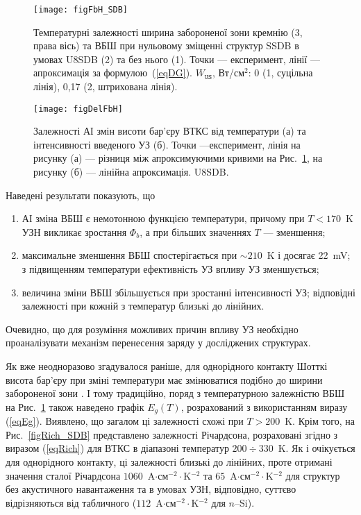 \begin{figure}
\center
\texttt{[image: figFbH\_SDB]}
\caption{\label{figFbH_SDB}
Температурні залежності ширина забороненої зони кремнію (3, права вісь)
та ВБШ при нульовому зміщенні структур SSDB в умовах U8SDB (2) та без нього (1).
Точки --- експеримент,
лінії --- апроксимація за формулою~(\ref{eqDG}).
$W_\mathtt{US}$,  Вт/см$^2$: 0 (1, суцільна лінія), 0,17 (2, штрихована лінія).
}%
\end{figure}


\begin{figure}
\center
\texttt{[image: figDelFbH]}
\caption{\label{figDelFbH}
Залежності АІ змін висоти бар'єру ВТКС від температури (а) та інтенсивності введеного УЗ (б).
Точки ---експеримент,
лінія на рисунку (а) --- різниця між апроксимуючими кривими на Рис.~\ref{figFbH_SDB},
на рисунку (б) --- лінійна апроксимація.
U8SDB.
}%
\end{figure}

Наведені результати показують, що
\begin{enumerate}[label=\asbuk*),leftmargin=0em,itemindent=1.5em]
\item АІ зміна ВБШ є немотонною функцією температури, причому при $T<170$~K УЗН викликає зростання $\Phi_b$,
а при більших значеннях $T$ --- зменшення;
\item максимальне зменшення ВБШ спостерігається при $\sim210$~K і досягає 22~mV;
з підвищенням температури ефективність УЗ впливу УЗ зменшується;
\item величина зміни ВБШ збільшується при зростанні інтенсивності УЗ; відповідні залежності при кожній з температур
близькі до лінійних.
\end{enumerate}
Очевидно, що для розуміння можливих причин впливу УЗ необхідно проаналізувати механізм перенесення заряду
у досліджених структурах.

Як вже неодноразово згадувалося раніше, для однорідного контакту Шотткі висота бар'єру при зміні температури має змінюватися подібно
до ширини забороненої зони \cite{Rhoderick1988,Aboelfotoh,Zhua}.
І тому традиційно, поряд з температурною залежністю ВБШ на Рис.~\ref{figFbH_SDB} також наведено графік $E_g(T)$,
розрахований з використанням виразу (\ref{eqEg}).
Виявлено, що загалом ці залежності схожі при $T>200$~K.
Крім того, на Рис.~\ref{figRich_SDB} представлено залежності Річардсона, розраховані згідно з
виразом (\ref{eqRich}) для ВТКС в діапазоні температур $200\div330$~K.
Як і очікується для однорідного контакту, ці залежності близькі до лінійних,
проте отримані значення сталої Річардсона $1060$~A$\cdot$см$^{-2}\cdot$K$^{-2}$ та $65$~A$\cdot$см$^{-2}\cdot$K$^{-2}$
для структур без акустичного навантаження та в умовах УЗН, відповідно, суттєво відрізняються
від табличного ($112$~A$\cdot$см$^{-2}\cdot$K$^{-2}$ для $n$--Si).


